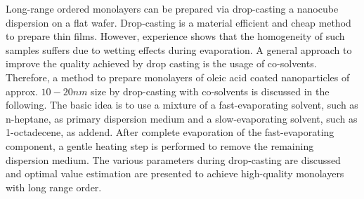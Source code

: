 \documentclass[\main/dresen_thesis.tex]{subfiles}
\begin{document}
  Long-range ordered monolayers can be prepared via drop-casting a nanocube dispersion on a flat wafer.
  Drop-casting is a material efficient and cheap method to prepare thin films.
  However, experience shows that the homogeneity of such samples suffers due to wetting effects during evaporation.
  A general approach to improve the quality achieved by drop casting is the usage of co-solvents.
  Therefore, a method to prepare monolayers of oleic acid coated nanoparticles of approx. $10 - 20 \unit{nm}$ size by drop-casting with co-solvents is discussed in the following.
  The basic idea is to use a mixture of a fast-evaporating solvent, such as n-heptane, as primary dispersion medium and a slow-evaporating solvent, such as 1-octadecene, as addend.
  After complete evaporation of the fast-evaporating component, a gentle heating step is performed to remove the remaining dispersion medium.
  The various parameters during drop-casting are discussed and optimal value estimation are presented to achieve high-quality monolayers with long range order.
\end{document}
